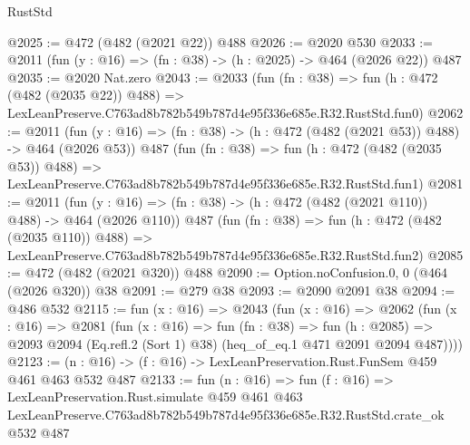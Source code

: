 \begin{lexlean}{RustStd}
\begin{coremodule}
@2025 := @472 (@482 (@2021 @22)) @488
@2026 := @2020 @530
@2033 := @2011 (fun (y : @16) => (fn : @38) -> (h : @2025) -> @464 (@2026 @22)) @487
@2035 := @2020 Nat.zero
@2043 := @2033
    (fun (fn : @38) =>
    fun (h : @472 (@482 (@2035 @22)) @488) =>
    LexLeanPreserve.C763ad8b782b549b787d4e95f336e685e.R32.RustStd.fun0)
@2062 := @2011
    (fun (y : @16) => (fn : @38) -> (h : @472 (@482 (@2021 @53)) @488) -> @464 (@2026 @53))
    @487
    (fun (fn : @38) =>
    fun (h : @472 (@482 (@2035 @53)) @488) =>
    LexLeanPreserve.C763ad8b782b549b787d4e95f336e685e.R32.RustStd.fun1)
@2081 := @2011
    (fun (y : @16) => (fn : @38) -> (h : @472 (@482 (@2021 @110)) @488) -> @464 (@2026 @110))
    @487
    (fun (fn : @38) =>
    fun (h : @472 (@482 (@2035 @110)) @488) =>
    LexLeanPreserve.C763ad8b782b549b787d4e95f336e685e.R32.RustStd.fun2)
@2085 := @472 (@482 (@2021 @320)) @488
@2090 := Option.noConfusion.{0, 0} (@464 (@2026 @320)) @38
@2091 := @279 @38
@2093 := @2090 @2091 @38
@2094 := @486 @532
@2115 := fun (x : @16) =>
  @2043
    (fun (x : @16) =>
    @2062
      (fun (x : @16) =>
      @2081
        (fun (x : @16) =>
        fun (fn : @38) =>
        fun (h : @2085) =>
        @2093 @2094 (Eq.refl.{2} (Sort 1) @38) (heq_of_eq.{1} @471 @2091 @2094 @487))))
@2123 := (n : @16) -> (f : @16) -> LexLeanPreservation.Rust.FunSem @459 @461 @463 @532 @487
@2133 := fun (n : @16) =>
  fun (f : @16) =>
  LexLeanPreservation.Rust.simulate
    @459
    @461
    @463
    LexLeanPreserve.C763ad8b782b549b787d4e95f336e685e.R32.RustStd.crate_ok
    @532
    @487
\end{coremodule}
\end{lexlean}
